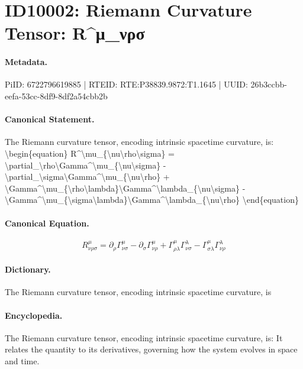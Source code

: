 \section*{ID10002: Riemann Curvature Tensor: R\textasciicircum{}μ\_νρσ}
\paragraph{Metadata.}
PiID: 6722796619885 | RTEID: RTE:P38839.9872:T1.1645 | UUID: 26b3ccbb-eefa-53cc-8df9-8df2a54cbb2b

\paragraph{Canonical Statement.}
The Riemann curvature tensor, encoding intrinsic spacetime curvature, is: \textbackslash{}begin\{equation\} R\textasciicircum{}\textbackslash{}mu\_\{\textbackslash{}nu\textbackslash{}rho\textbackslash{}sigma\} = \textbackslash{}partial\_\textbackslash{}rho\textbackslash{}Gamma\textasciicircum{}\textbackslash{}mu\_\{\textbackslash{}nu\textbackslash{}sigma\} - \textbackslash{}partial\_\textbackslash{}sigma\textbackslash{}Gamma\textasciicircum{}\textbackslash{}mu\_\{\textbackslash{}nu\textbackslash{}rho\} + \textbackslash{}Gamma\textasciicircum{}\textbackslash{}mu\_\{\textbackslash{}rho\textbackslash{}lambda\}\textbackslash{}Gamma\textasciicircum{}\textbackslash{}lambda\_\{\textbackslash{}nu\textbackslash{}sigma\} - \textbackslash{}Gamma\textasciicircum{}\textbackslash{}mu\_\{\textbackslash{}sigma\textbackslash{}lambda\}\textbackslash{}Gamma\textasciicircum{}\textbackslash{}lambda\_\{\textbackslash{}nu\textbackslash{}rho\} \textbackslash{}end\{equation\}

\paragraph{Canonical Equation.}
\[
R^\mu_{\nu\rho\sigma} = \partial_\rho\Gamma^\mu_{\nu\sigma} - \partial_\sigma\Gamma^\mu_{\nu\rho} + \Gamma^\mu_{\rho\lambda}\Gamma^\lambda_{\nu\sigma} - \Gamma^\mu_{\sigma\lambda}\Gamma^\lambda_{\nu\rho}
\]

\paragraph{Dictionary.}
The Riemann curvature tensor, encoding intrinsic spacetime curvature, is

\paragraph{Encyclopedia.}
The Riemann curvature tensor, encoding intrinsic spacetime curvature, is: It relates the quantity to its derivatives, governing how the system evolves in space and time.
